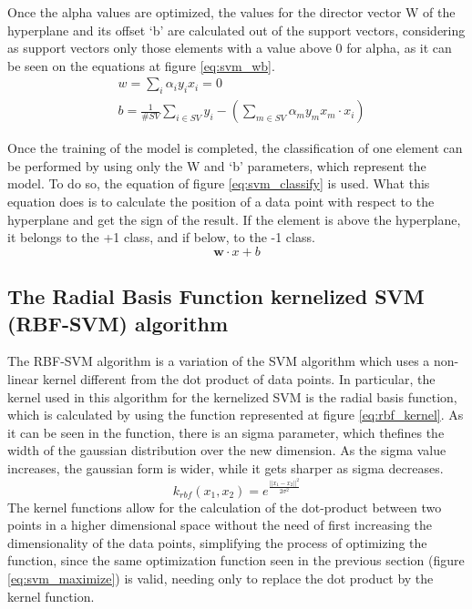 \documentclass[10pt, journal]{IEEEtran}
\begin{document}
Once the alpha values are optimized, the values for the director vector W of the hyperplane and its offset `b' are calculated out of the support vectors, considering as support vectors only those elements with a value above 0 for alpha, as it can be seen on the equations at figure \ref{eq:svm_wb}.\\
\begin{equation}
	\begin{aligned}
		&w = \sum_i{\alpha_iy_ix_i} = 0\\
		&b = \frac{1}{\#SV}\sum_{i \in SV}{y_i-(\sum_{m \in SV}{\alpha_my_mx_m\cdot x_i})}
	\end{aligned}
	\label{eq:svm_wb}
\end{equation}

Once the training of the model is completed, the classification of one element can be performed by using only the W and `b' parameters, which represent the model. To do so, the equation of figure \ref{eq:svm_classify} is used. What this equation does is to calculate the position of a data point with respect to the hyperplane and get the sign of the result. If the element is above the hyperplane, it belongs to the +1 class, and if below, to the -1 class.
\begin{equation}
	\mathbf{w}\cdot x + b
	\label{eq:svm_classify}
\end{equation}

\subsection{The Radial Basis Function kernelized SVM (RBF-SVM) algorithm} %
\label{sub:the_radial_basis_function_kernelized_svm_rbf_svm_algorithm}

The RBF-SVM algorithm is a variation of the SVM algorithm which uses a non-linear kernel different from the dot product of data points. In particular, the kernel used in this algorithm for the kernelized SVM is the radial basis function, which is calculated by using the function represented at figure \ref{eq:rbf_kernel}. As it can be seen in the function, there is an sigma parameter, which thefines the width of the gaussian distribution over the new dimension. As the sigma value increases, the gaussian form is wider, while it gets sharper as sigma decreases.\\
\begin{equation}
	k_{rbf}(x_1,x_2) = e^\frac{||x_1-x_2||^2}{2\sigma^2}
	\label{eq:rbf_kernel}
\end{equation}
The kernel functions allow for the calculation of the dot-product between two points in a higher dimensional space without the need of first increasing the dimensionality of the data points, simplifying the process of optimizing the function, since the same optimization function seen in the previous section (figure \ref{eq:svm_maximize}) is valid, needing only to replace the dot product by the kernel function.\\
\end{document}

